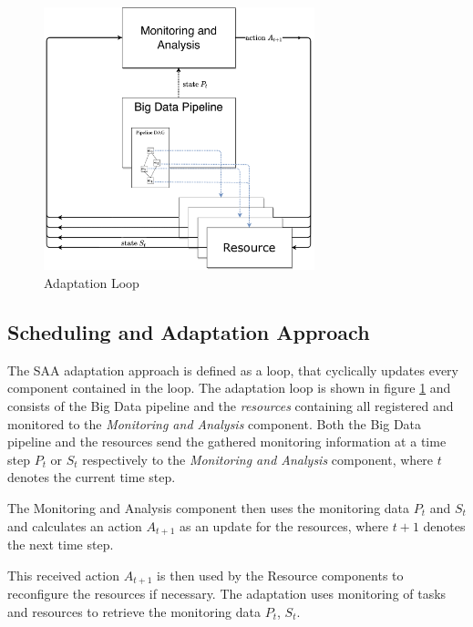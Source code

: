         \begin{figure}[h!]
            \centering
            \includegraphics[width=0.7\textwidth]{figures/monitoring_with_inner_resources.drawio.pdf}
            \caption{Adaptation Loop}
            \label{fig:adaptation-loop}
        \end{figure}

        \subsection{Scheduling and Adaptation Approach}
        \label{sec:scheduling-adaptation-approach-saa-background}

            The SAA adaptation approach is defined as a loop, that cyclically updates every component contained in the loop.
            The adaptation loop is shown in figure \ref{fig:adaptation-loop} and consists of the Big Data pipeline and the \emph{resources} containing all registered and monitored to the \emph{Monitoring and Analysis} component. 
            Both the Big Data pipeline and the resources send the gathered monitoring information at a time step $P_t$ or $S_t$ respectively to the \emph{Monitoring and Analysis} component, where $t$ denotes the current time step.

            The Monitoring and Analysis component then uses the monitoring data $P_t$ and $S_t$ and calculates an action $A_{t+1}$ as an update for the resources, where $t+1$ denotes the next time step.
    
            This received action $A_{t+1}$ is then used by the Resource components to reconfigure the resources if necessary.
            The adaptation uses monitoring of tasks and resources to retrieve the monitoring data $P_t$, $S_t$.
            
